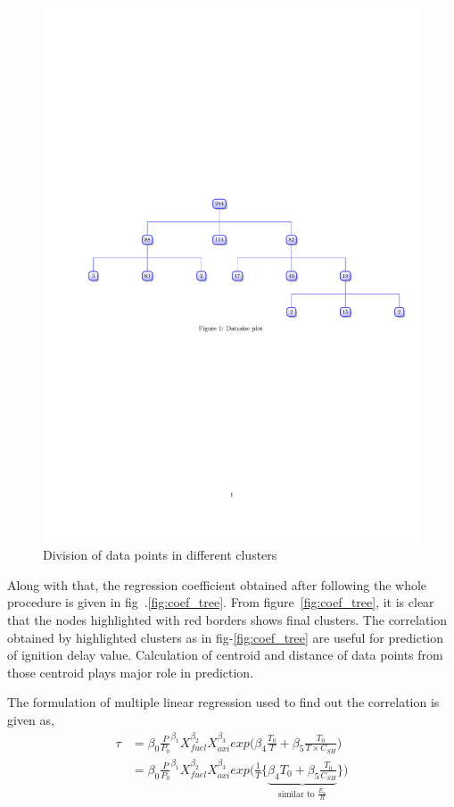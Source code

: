 \documentclass[12pt]{article}
\begin{document}
\begin{figure}[H]
	\centering
	\includegraphics[trim={2cm 12.5cm 0 10cm},clip,scale=0.73]{Datasize.pdf}
	\caption{Division of data points in different clusters}
	\label{fig:datapoints_tree}
\end{figure}

Along with that, the regression coefficient obtained  after following the whole procedure is given in fig~.\ref{fig:coef_tree}. From figure~\ref{fig:coef_tree}, it is clear that the nodes highlighted with red borders shows final clusters. The correlation obtained by highlighted clusters as in fig-\ref{fig:coef_tree} are useful for prediction of ignition delay value. Calculation of centroid and distance of data points from those centroid plays major role in prediction. 

The formulation of multiple linear regression used to find out the correlation is given as,
\begin{align}
	\tau &= \beta_0 \frac{P}{P_0}^{\beta_1} X_{fuel}^{\beta_2} X_{oxi}^{\beta_3} exp \bigg({\beta_4 \frac{T_0}{T} + \beta_5 \frac{T_0}{T \times C_{SH}}}\bigg) \\
	 &= \beta_0 \frac{P}{P_0}^{\beta_1} X_{fuel}^{\beta_2} X_{oxi}^{\beta_3} exp \bigg(\frac{1}{T}\bigg\{\underbrace{\beta_4 {T_0} + \beta_5 \frac{T_0}{C_{SH}}}_\text{similar to $\frac{E_a}{R}$}\bigg\}\bigg)
\end{align}		 
\end{document}
